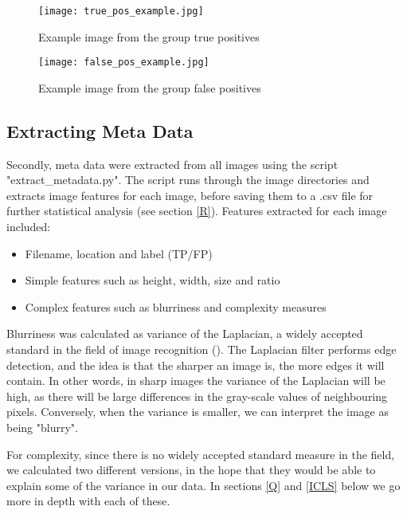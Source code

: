 \documentclass[12pt]{article}
\begin{document}
\begin{figure}
	\begin{center}
		\texttt{[image: true\_pos\_example.jpg]}
	\end{center}
	\caption{Example image from the group true positives}
	\label{fig:truepos}
\end{figure}

\begin{figure}
	\begin{center}
		\texttt{[image: false\_pos\_example.jpg]}
	\end{center}
	\caption{Example image from the group false positives}
	\label{fig:falsepos}
\end{figure}

\subsection{Extracting Meta Data}
Secondly, meta data were extracted from all images using the script "extract\_metadata.py". The script runs through the image directories and extracts image features for each image, before saving them to a .csv file for further statistical  analysis (see section \ref{R}).
Features extracted for each image included:

\begin{itemize}
	\item Filename, location and label (TP/FP)
	\item Simple features such as height, width, size and ratio
	\item Complex features such as blurriness and complexity measures
\end{itemize}

Blurriness was calculated as variance of the Laplacian, a widely accepted standard in the field of image recognition (\cite{bansalBlurImageDetection2016}). The Laplacian filter performs edge detection, and the idea is that the sharper an image is, the more edges it will contain. In other words, in sharp images the variance of the Laplacian will be high, as there will be large differences in the gray-scale values of neighbouring pixels. Conversely, when the variance is smaller, we can interpret the image as being "blurry".

For complexity, since there is no widely accepted standard measure in the field, we calculated two different versions, in the hope that they would be able to explain some of the variance in our data. In sections \ref{Q} and \ref{ICLS} below we go more in depth with each of these.
\end{document}
